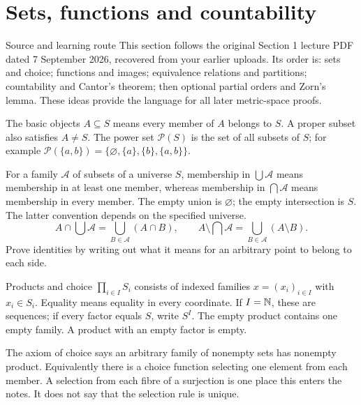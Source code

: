 \clearpage
\setcounter{section}{0}
\section{Sets, functions and countability}
\begin{note}{Source and learning route}
This section follows the original Section 1 lecture PDF dated 7 September 2026, recovered from your earlier uploads. Its order is: sets and choice; functions and images; equivalence relations and partitions; countability and Cantor's theorem; then optional partial orders and Zorn's lemma. These ideas provide the language for all later metric-space proofs.
\end{note}
\begin{note}{The basic objects}
$A\subseteq S$ means every member of $A$ belongs to $S$. A proper subset also satisfies $A\ne S$. The power set $\mathcal P(S)$ is the set of all subsets of $S$; for example $\mathcal P(\{a,b\})=\{\varnothing,\{a\},\{b\},\{a,b\}\}$.

For a family $\mathcal A$ of subsets of a universe $S$, membership in $\bigcup\mathcal A$ means membership in at least one member, whereas membership in $\bigcap\mathcal A$ means membership in every member. The empty union is $\varnothing$; the empty intersection is $S$. The latter convention depends on the specified universe.
\[A\cap\bigcup\mathcal A=\bigcup_{B\in\mathcal A}(A\cap B),\qquad A\setminus\bigcap\mathcal A=\bigcup_{B\in\mathcal A}(A\setminus B).\]
Prove identities by writing out what it means for an arbitrary point to belong to each side.
\end{note}
\begin{note}{Products and choice}
$\prod_{i\in I}S_i$ consists of indexed families $x=(x_i)_{i\in I}$ with $x_i\in S_i$. Equality means equality in every coordinate. If $I=\mathbb N$, these are sequences; if every factor equals $S$, write $S^I$. The empty product contains one empty family. A product with an empty factor is empty.

The axiom of choice says an arbitrary family of nonempty sets has nonempty product. Equivalently there is a choice function selecting one element from each member. A selection from each fibre of a surjection is one place this enters the notes. It does not say that the selection rule is unique.
\end{note}
